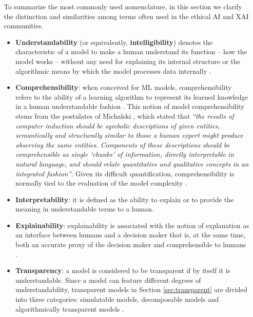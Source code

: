 \documentclass[final]{elsarticle}
\begin{document}
To summarize the most commonly used nomenclature, in this section we clarify the distinction and similarities among terms often used in the ethical AI and XAI communities.
\begin{itemize}[leftmargin=*]
\item \textbf{Understandability} (or equivalently, \textbf{intelligibility}) denotes the characteristic of a model to make a human understand its function -- how the model works -- without any need for explaining its internal structure or the algorithmic means by which the model processes data internally \cite{Montavon18}. 

\item \textbf{Comprehensibility}: when conceived for ML models, comprehensibility refers to the ability of a learning algorithm to represent its learned knowledge in a human understandable fashion \cite{Fernandez19,gleicher2016framework,craven1996extracting}. This notion of model comprehensibility stems from the postulates of Michalski \cite{michalski1983theory}, which stated that \emph{``the results of computer induction should be symbolic descriptions of given entities, semantically and structurally similar to those a human expert might produce observing the same entities. Components of these descriptions should be comprehensible as single `chunks' of information, directly interpretable in natural language, and should relate quantitative and qualitative concepts in an integrated fashion''}. Given its difficult quantification, comprehensibility is normally tied to the evaluation of the model complexity \cite{Guidotti19}. 

\item \textbf{Interpretability}: it is defined as the ability to explain or to provide the meaning in understandable terms to a human. %

\item \textbf{Explainability}: explainability is associated with the notion of explanation as an interface between humans and a decision maker that is, at the same time, both an accurate proxy of the decision maker and comprehensible to humans \cite{Guidotti19}.%

\item \textbf{Transparency}: a model is considered to be transparent if by itself it is understandable. Since a model can feature different degrees of understandability, transparent models in Section \ref{sec:transparent} are divided into three categories: simulatable models, decomposable models and algorithmically transparent models \cite{Lipton18}.
\end{itemize}
\end{document}
